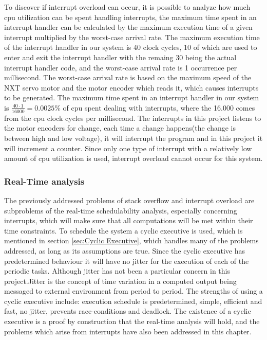 To discover if interrupt overload can occur, it is possible to analyze how much cpu utilization can be spent handling interrupts, the maximum time spent in an interrupt handler can be calculated by the maximum execution time of a given interrupt multiplied by the worst-case arrival rate. \newline
The maximum execution time of the interrupt handler in our system is 40 clock cycles, 10 of which are used to enter and exit the interrupt handler with the remaing 30 being the actual interrupt handler code, and the worst-case arrival rate is 1 occurrence per millisecond. The worst-case arrival rate is based on the maximum speed of the NXT servo motor and the motor encoder which reads it, which causes interrupts to be generated. \newline
The maximum time spent in an interrupt handler in our system is \begin{math} \frac{40 \cdot 1}{16000} = 0.0025\% \end{math} of cpu spent dealing with interrupts, where the 16.000 comes from the cpu clock cycles per millisecond. The interrupts in this project listens to the motor encoders for change, each time a change happens(the change is between high and low voltage), it will interrupt the program and in this project it will increment a counter. Since only one type of interrupt with a relatively low amount of cpu utilization is used, interrupt overload cannot occur for this system. 


\subsubsection{Real-Time analysis}
\label{sec:Real-Time analysis}
The previously addressed problems of stack overflow and interrupt overload are subproblems of the real-time schedulability analysis, especially concerning interrupts, which will make sure that all computations will be met within their time constraints. \newline
To schedule the system a cyclic executive is used, which is mentioned in section \ref{sec:Cyclic Executive}, which handles many of the problems addressed, as long as its assumptions are true. 
Since the cyclic executive has predetermined behaviour it will have no jitter for the execution of each of the periodic tasks. Although jitter has not been a particular concern in this project.\newline Jitter is the concept of time variation in a computed output being messaged to external environment from period to period. \newline
The strengths of using a cyclic executive include: execution schedule is predetermined, simple, efficient and fast, no jitter, prevents race-conditions and deadlock. 
The existence of a cyclic executive is a proof by construction that the real-time analysis will hold, and the problems which arise from interrupts have also been addressed in this chapter.
